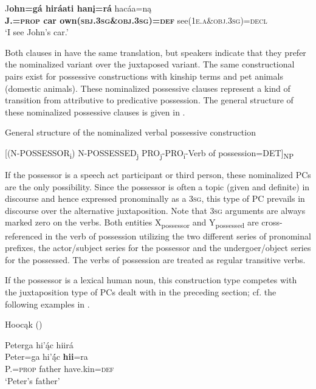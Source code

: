 \documentclass[output=paper]{LSP/langsci}
\begin{document}
\ex 
\gll J\textbf{ohn=g\'a hir\'aati han\k{i}=r\'a} hac\'aa=n\k{a}  \\
\textbf{J.=\textsc{prop} car own(\textsc{sbj.3sg}\&\textsc{obj.3sg})=\textsc{def}} see(\textsc{1e.a}\&\textsc{obj.3sg})=\textsc{decl}  \\
\glt `I see John's car.'
\z
\z 

Both clauses in  have the same translation, but speakers indicate that they prefer the nominalized variant over the juxtaposed variant. The same constructional pairs exist for possessive constructions with kinship terms and pet animals (domestic animals). These nominalized possessive clauses represent a kind of transition from attributive to predicative possession. The general structure of these nominalized possessive clauses is given in .

\ea General structure of the nominalized verbal possessive construction \label{generalstructure}

[(N-POSSESSOR\textsubscript{i})  N-POSSESSED\textsubscript{j}    PRO\textsubscript{j}-PRO\textsubscript{i}-Verb of possession=DET]\textsubscript{NP}
\z

If the possessor is a speech act participant or third person, these nominalized PCs are the only possibility. Since the possessor is often a topic (given and definite) in discourse and hence expressed pronominally as a \textsc{3sg}, this type of PC prevails in discourse over the alternative juxtaposition. Note that \textsc{3sg} arguments are always marked zero on the verbs. Both entities X\textsubscript{possessor} and Y\textsubscript{possessed} are cross-referenced in the verb of possession utilizing the two different series of pronominal prefixes, the actor/subject series for the possessor and the undergoer/object series for the possessed. The verbs of possession are treated as regular transitive verbs.

If the possessor is a lexical human noun, this construction type competes with the juxtaposition type of PCs dealt with in the preceding section; cf. the following examples in .
 
\ea Hoocąk (\citealt[16]{Helmbrecht2003}) \label{petersthings}

\ea 
\glll Peterga hi'ą́c hiirá \\
Peter=ga        hi’ą́́c   \textbf{hii}=ra \\
P.=\textsc{prop}  father have.kin=\textsc{def} \\
\glt `Peter's father'
\end{document}

